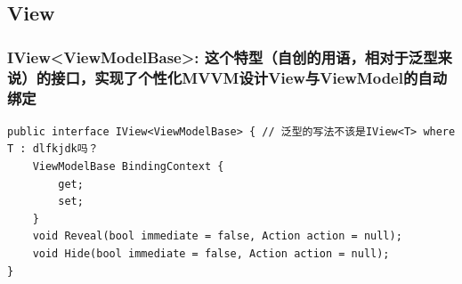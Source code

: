 \documentclass[9pt, b5paper]{article}
\begin{document}
\subsection{View}
\label{sec-6-4}
\subsubsection{IView<ViewModelBase>: 这个特型（自创的用语，相对于泛型来说）的接口，实现了个性化MVVM设计View与ViewModel的自动绑定}
\label{sec-6-4-1}
\begin{verbatim}
public interface IView<ViewModelBase> { // 泛型的写法不该是IView<T> where T : dlfkjdk吗？
    ViewModelBase BindingContext {
        get;
        set;
    }
    void Reveal(bool immediate = false, Action action = null);
    void Hide(bool immediate = false, Action action = null);
}
\end{verbatim}
\end{document}
